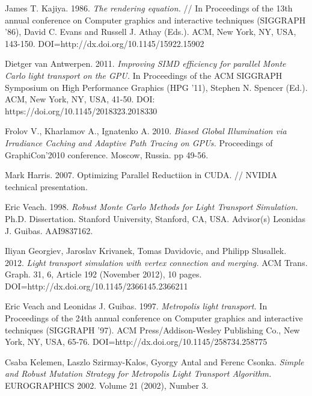 \documentclass[twoside,twocolumn,10pt]{article}
\begin{document}

\begin{thebibliography}{99}
\label{references}
 James T. Kajiya. 1986. \textit{The rendering equation.} // In Proceedings of the 13th annual conference on Computer graphics and interactive techniques (SIGGRAPH '86), David C. Evans and Russell J. Athay (Eds.). ACM, New York, NY, USA, 143-150. DOI=http://dx.doi.org/10.1145/15922.15902

 Dietger van Antwerpen. 2011. \textit{Improving SIMD efficiency for parallel Monte Carlo light transport on the GPU.} In Proceedings of the ACM SIGGRAPH Symposium on High Performance Graphics (HPG '11), Stephen N. Spencer (Ed.). ACM, New York, NY, USA, 41-50. DOI: https://doi.org/10.1145/2018323.2018330 

 Frolov V., Kharlamov A., Ignatenko A. 2010. \textit{Biased Global Illumination via Irradiance Caching and Adaptive Path Tracing on GPUs.} Proceedings of GraphiCon'2010 conference. Moscow, Russia. pp 49-56.

 Mark Harris. 2007. Optimizing Parallel Reductiion in CUDA. // NVIDIA technical presentation.

 Eric Veach. 1998. \textit{Robust Monte Carlo Methods for Light Transport Simulation.} Ph.D. Dissertation. Stanford University, Stanford, CA, USA. Advisor(s) Leonidas J. Guibas. AAI9837162. 

 Iliyan Georgiev, Jaroslav Krivanek, Tomas Davidovic, and Philipp Slusallek. 2012. \textit{Light transport simulation with vertex connection and merging.} ACM Trans. Graph. 31, 6, Article 192 (November 2012), 10 pages. DOI=http://dx.doi.org/10.1145/2366145.2366211 

 Eric Veach and Leonidas J. Guibas. 1997. \textit{Metropolis light transport.} In Proceedings of the 24th annual conference on Computer graphics and interactive techniques (SIGGRAPH '97). ACM Press/Addison-Wesley Publishing Co., New York, NY, USA, 65-76. DOI=http://dx.doi.org/10.1145/258734.258775 

 Csaba Kelemen, Laszlo Szirmay-Kalos, Gyorgy Antal and Ferenc Csonka. \textit{Simple and Robust Mutation Strategy for Metropolis Light Transport Algorithm.} EUROGRAPHICS 2002. Volume 21 (2002), Number 3.


\end{thebibliography}
\end{document}
